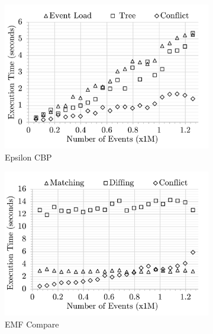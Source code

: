 \begin{figure}[ht]
    \centering
    \begin{subfigure}[t]{0.32\linewidth}
        \includegraphics[width=\linewidth]{ecbp-conflict-time-events}
        \caption{Epsilon CBP}
        \label{fig:ecbp-conflict-time-events}
    \end{subfigure}
    \hfill
    \begin{subfigure}[t]{0.32\linewidth}
        \includegraphics[width=\linewidth]{emfc-conflict-time-events}
        \caption{EMF Compare}
        \label{fig:emfc-conflict-time-events}
    \end{subfigure}
    \hfill
    \begin{subfigure}[t]{0.32\linewidth}

\end{subfigure}
\end{figure}
